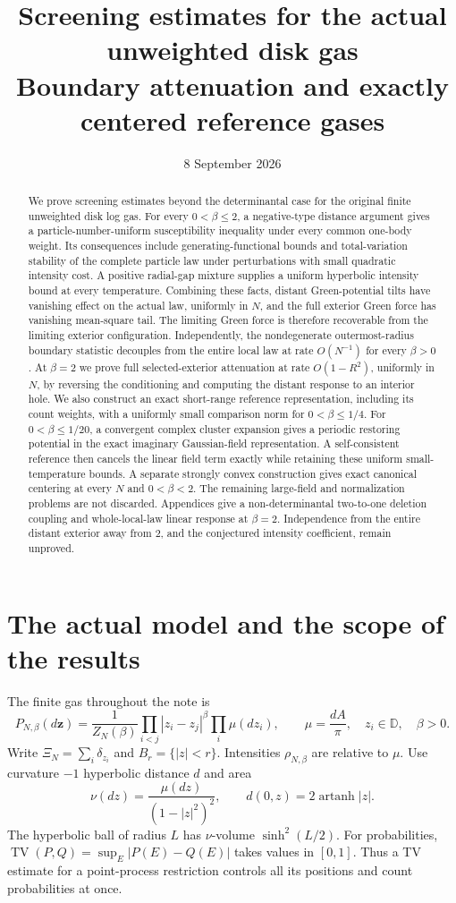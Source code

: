 \documentclass[11pt]{article}
\title{Screening estimates for the actual unweighted disk gas\\[4pt]
\large Boundary attenuation and exactly centered reference gases}
\author{}
\date{8 September 2026}
\newcommand{\D}{\mathbb D}
\DeclareMathOperator{\TV}{TV}
\theoremstyle{remark}\newtheorem{remark}[theorem]{Remark}
\begin{document}
\maketitle
\vspace{-1.5em}
\begin{abstract}
We prove screening estimates beyond the determinantal case for the
original finite unweighted disk log gas. For every $0<\beta\le2$,
a negative-type distance argument gives a particle-number-uniform
susceptibility inequality under every common one-body weight. Its
consequences include generating-functional bounds and total-variation
stability of the complete particle law under perturbations with small
quadratic intensity cost. A positive radial-gap mixture supplies a
uniform hyperbolic intensity bound at every temperature. Combining
these facts, distant Green-potential tilts have vanishing effect on
the actual law, uniformly in $N$, and the full exterior Green force
has vanishing mean-square tail. The limiting Green force is therefore
recoverable from the limiting exterior configuration. Independently,
the nondegenerate outermost-radius boundary statistic decouples from
the entire local law at rate $O(N^{-1})$ for every $\beta>0$.
At $\beta=2$ we prove full selected-exterior attenuation at rate
$O(1-R^2)$, uniformly in $N$, by reversing the conditioning and
computing the distant response to an interior hole.
We also construct an exact short-range reference representation,
including its count weights, with a uniformly small comparison norm
for $0<\beta\le1/4$. For $0<\beta\le1/20$, a convergent complex
cluster expansion gives a periodic restoring potential in the exact
imaginary Gaussian-field representation. A self-consistent reference
then cancels the linear field term exactly while retaining these
uniform small-temperature bounds. A separate strongly convex
construction gives exact canonical centering at every $N$ and
$0<\beta<2$. The remaining large-field and normalization problems
are not discarded.
Appendices give a non-determinantal two-to-one deletion coupling and
whole-local-law linear response at $\beta=2$. Independence from the
entire distant exterior away from $2$, and the conjectured intensity
coefficient, remain unproved.
\end{abstract}
\clearpage
\tableofcontents
\clearpage

\section{The actual model and the scope of the results}
The finite gas throughout the note is
\[
 P_{N,\beta}(d\mathbf z)
 =\frac1{Z_N(\beta)}\prod_{i<j}|z_i-z_j|^\beta
                   \prod_i\mu(dz_i),\qquad
 \mu=\frac{dA}{\pi},\quad z_i\in\D,\quad\beta>0.
\]
Write $\Xi_N=\sum_i\delta_{z_i}$ and $B_r=\{|z|<r\}$.
Intensities $\rho_{N,\beta}$ are relative to $\mu$. Use curvature
$-1$ hyperbolic distance $d$ and area
\[
 \nu(dz)=\frac{\mu(dz)}{(1-|z|^2)^2},\qquad
 d(0,z)=2\operatorname{artanh}|z|.
\]
The hyperbolic ball of radius $L$ has $\nu$-volume $\sinh^2(L/2)$.
For probabilities, $\TV(P,Q)=\sup_E|P(E)-Q(E)|$ takes values in
$[0,1]$. Thus a TV estimate for a point-process restriction controls
all its positions and count probabilities at once.
\end{document}
